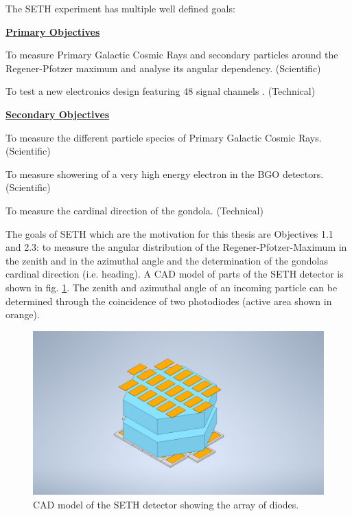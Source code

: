 \newpage
The \ac{SETH} experiment has multiple well defined goals:

    \underline{\textbf{Primary Objectives}}
		\begin{description}\setlength\itemsep{-1em}
			\item[Obj. 1.1:] To measure Primary Galactic Cosmic Rays and secondary particles around the Regener-Pfotzer maximum and analyse its angular dependency. (Scientific)
			\item[Obj. 1.2:] To test a new electronics design featuring 48 signal channels . (Technical)
		\end{description}
	\underline{\textbf{Secondary Objectives}}
		\begin{description}\setlength\itemsep{-1em}
			\item[Obj. 2.1:] To measure the different particle species of Primary Galactic Cosmic Rays. (Scientific)
            \item[Obj. 2.2:] To measure showering of a very high energy electron in the \ac{BGO} detectors. (Scientific)
            \item[Obj. 2.3:] To measure the cardinal direction of the gondola. (Technical)
		\end{description}

The goals of \ac{SETH} which are the motivation for this thesis are Objectives 1.1 and 2.3: to measure the angular distribution of the Regener-Pfotzer-Maximum in the zenith and in the azimuthal angle and the determination of the gondolas cardinal direction (i.e. heading). A \ac{CAD} model of parts of the \ac{SETH} detector is shown in fig. \ref{fig:seth_cad}. The zenith and azimuthal angle of an incoming particle can be determined through the coincidence of two photodiodes (active area shown in orange).

\begin{figure}[H]
    \centering
    \includegraphics[width=0.5\linewidth, trim = {5cm 0cm 5cm 0cm}, clip]{images/01_background/SETH-Sketch.jpeg}
    \caption[\ac{SETH} detector sketch]{\ac{CAD} model of the \ac{SETH} detector showing the array of diodes.}
    \label{fig:seth_cad}
\end{figure}

